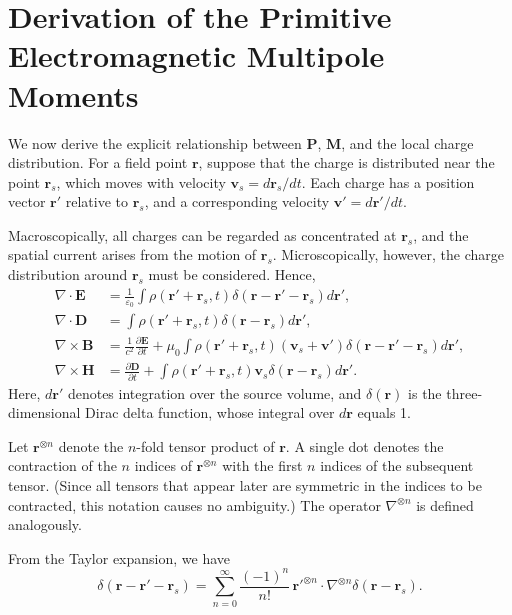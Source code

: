 \documentclass{article}
\begin{document}
	\section{Derivation of the Primitive Electromagnetic Multipole Moments}
	
	We now derive the explicit relationship between $\bm{P}$, $\bm{M}$, and the local charge distribution.  
	For a field point $\bm{r}$, suppose that the charge is distributed near the point $\bm{r}_s$, which moves with velocity $\bm{v}_s = d\bm{r}_s/dt$. Each charge has a position vector $\bm{r}'$ relative to $\bm{r}_s$, and a corresponding velocity $\bm{v}' = d\bm{r}'/dt$.
	
	Macroscopically, all charges can be regarded as concentrated at $\bm{r}_s$, and the spatial current arises from the motion of $\bm{r}_s$. Microscopically, however, the charge distribution around $\bm{r}_s$ must be considered. Hence,
	\[
	\begin{split}
		\nabla \cdot \bm{E} &= \frac{1}{\varepsilon_0} \int \rho\!\left( \bm{r}' + \bm{r}_s, t \right) \delta\!\left( \bm{r} - \bm{r}' - \bm{r}_s \right) d\bm{r}', \\
		\nabla \cdot \bm{D} &= \int \rho\!\left( \bm{r}' + \bm{r}_s, t \right) \delta\!\left( \bm{r} - \bm{r}_s \right) d\bm{r}', \\
		\nabla \times \bm{B} &= \frac{1}{c^2} \frac{\partial \bm{E}}{\partial t} + \mu_0 \int \rho\!\left( \bm{r}' + \bm{r}_s, t \right) \left( \bm{v}_s + \bm{v}' \right) \delta\!\left( \bm{r} - \bm{r}' - \bm{r}_s \right) d\bm{r}', \\
		\nabla \times \bm{H} &= \frac{\partial \bm{D}}{\partial t} + \int \rho\!\left( \bm{r}' + \bm{r}_s, t \right) \bm{v}_s \delta\!\left( \bm{r} - \bm{r}_s \right) d\bm{r}'.
	\end{split}
	\]
	Here, $d\bm{r}'$ denotes integration over the source volume, and $\delta(\bm{r})$ is the three-dimensional Dirac delta function, whose integral over $d\bm{r}$ equals 1.
	
	Let $\bm{r}^{\otimes n}$ denote the $n$-fold tensor product of $\bm{r}$. A single dot denotes the contraction of the $n$ indices of $\bm{r}^{\otimes n}$ with the first $n$ indices of the subsequent tensor. (Since all tensors that appear later are symmetric in the indices to be contracted, this notation causes no ambiguity.) The operator $\nabla^{\otimes n}$ is defined analogously.
	
	From the Taylor expansion, we have
	\[
	\delta\!\left( \bm{r} - \bm{r}' - \bm{r}_s \right) 
	= \sum_{n=0}^{\infty} \frac{(-1)^n}{n!}\, 
	\bm{r}'^{\otimes n} \cdot \nabla^{\otimes n} \delta\!\left( \bm{r} - \bm{r}_s \right).
	\]
	
\end{document}
